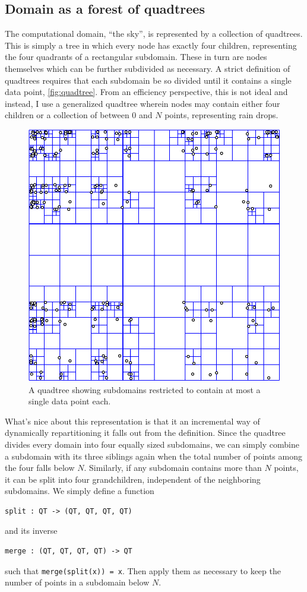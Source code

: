 \documentclass[twocolumn,a4paper,10pt]{article}
\begin{document}
\subsection{Domain as a forest of quadtrees}

The computational domain, ``the sky'', is represented by a collection of
quadtrees. This is simply a tree in which every node has exactly four children,
representing the four quadrants of a rectangular subdomain. These in turn are
nodes themselves which can be further subdivided as necessary. A strict
definition of quadtrees requires that each subdomain be so divided until it
contains a single data point, \autoref{fig:quadtree}. From an efficiency
perspective, this is not ideal and instead, I use a generalized quadtree wherein
nodes may contain either four children or a collection of between 0 and $N$
points, representing rain drops.

\begin{figure}[h]
    \centering
    \includegraphics[width=0.75\linewidth]{quadtree}
    \caption{A quadtree showing subdomains restricted to contain at most a
    single data point each.}
    \label{fig:quadtree}
\end{figure}

What's nice about this representation is that it an incremental way of
dynamically repartitioning it falls out from the definition. Since the quadtree
divides every domain into four equally sized subdomains, we can simply combine a
subdomain with its three siblings again when the total number of points among
the four falls below $N$. Similarly, if any subdomain contains more than $N$
points, it can be split into four grandchildren, independent of the neighboring
subdomains. We simply define a function
\begin{verbatim}
split : QT -> (QT, QT, QT, QT)
\end{verbatim}
and its inverse
\begin{verbatim}
merge : (QT, QT, QT, QT) -> QT
\end{verbatim}
such that \texttt{merge(split(x)) = x}. Then apply them as necessary to keep the
number of points in a subdomain below $N$.
\end{document}
